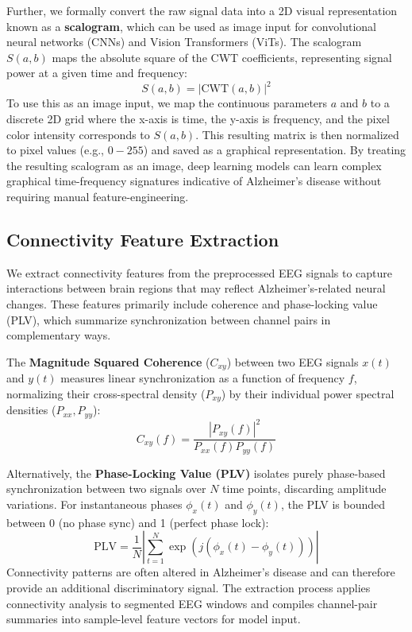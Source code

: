 \documentclass[openany]{book}
\begin{document}
Further, we formally convert the raw signal data into a 2D visual representation known as a \textbf{scalogram}, which can be used as image input for convolutional neural networks (CNNs) and Vision Transformers (ViTs). The scalogram $S(a,b)$ maps the absolute square of the CWT coefficients, representing signal power at a given time and frequency:
\begin{equation}
    S(a,b) = |\text{CWT}(a,b)|^2
\end{equation}
To use this as an image input, we map the continuous parameters $a$ and $b$ to a discrete 2D grid where the x-axis is time, the y-axis is frequency, and the pixel color intensity corresponds to $S(a,b)$. This resulting matrix is then normalized to pixel values (e.g., $0-255$) and saved as a graphical representation. By treating the resulting scalogram as an image, deep learning models can learn complex graphical time-frequency signatures indicative of Alzheimer's disease without requiring manual feature-engineering.
\subsection{Connectivity Feature Extraction}
We extract connectivity features from the preprocessed EEG signals to capture interactions between brain regions that may reflect Alzheimer's-related neural changes. These features primarily include coherence and phase-locking value (PLV), which summarize synchronization between channel pairs in complementary ways. 

The \textbf{Magnitude Squared Coherence} ($C_{xy}$) between two EEG signals $x(t)$ and $y(t)$ measures linear synchronization as a function of frequency $f$, normalizing their cross-spectral density ($P_{xy}$) by their individual power spectral densities ($P_{xx}, P_{yy}$):
\begin{equation}
    C_{xy}(f) = \frac{|P_{xy}(f)|^2}{P_{xx}(f)P_{yy}(f)}
\end{equation}

Alternatively, the \textbf{Phase-Locking Value (PLV)} isolates purely phase-based synchronization between two signals over $N$ time points, discarding amplitude variations. For instantaneous phases $\phi_x(t)$ and $\phi_y(t)$, the PLV is bounded between 0 (no phase sync) and 1 (perfect phase lock):
\begin{equation}
    \text{PLV} = \frac{1}{N} \left| \sum_{t=1}^{N} \exp(j(\phi_x(t) - \phi_y(t))) \right|
\end{equation}
Connectivity patterns are often altered in Alzheimer's disease and can therefore provide an additional discriminatory signal. The extraction process applies connectivity analysis to segmented EEG windows and compiles channel-pair summaries into sample-level feature vectors for model input.
\end{document}
